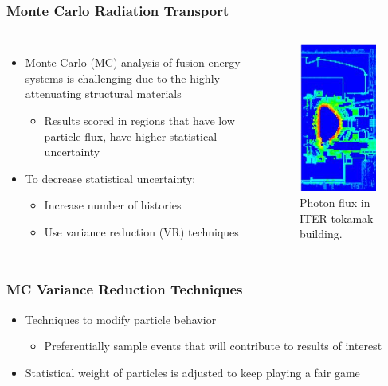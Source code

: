 \documentclass{beamer}
\begin{document}
\begin{frame}
\frametitle{Monte Carlo Radiation Transport}
\begin{columns}

\begin{itemize}
\item{Monte Carlo (MC) analysis of fusion energy systems is challenging due to the highly attenuating structural materials}
   \begin{itemize}
   \item{Results scored in regions that have low particle flux, have higher statistical uncertainty}
   \end{itemize}
\item{To decrease statistical uncertainty:}
\begin{itemize}
\item{Increase number of histories}
\item{Use variance reduction (VR) techniques}
\end{itemize}
\end{itemize}

\begin{figure}
	\centering
	\includegraphics[scale=0.5]{iter_pflux.jpg}
	\caption{Photon flux in ITER tokamak building.}
\end{figure}

\end{columns}
\end{frame}

\begin{frame}
\frametitle{MC Variance Reduction Techniques}
\begin{itemize}
\item{Techniques to modify particle behavior}
\begin{itemize}
\item{Preferentially sample events that will contribute to results of interest}
\end{itemize}
\item{Statistical weight of particles is adjusted to keep playing a fair game}
\end{itemize}
\end{frame}
\end{document}
